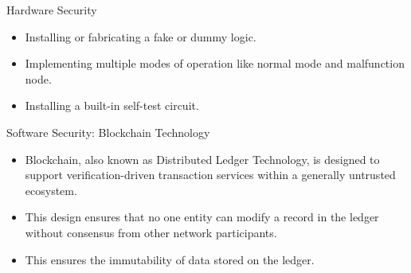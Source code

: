 \documentclass{beamer}
\begin{document}
\begin{frame}{Hardware Security}
    \begin{itemize}
        \item {Installing or fabricating a fake or dummy logic.}
        \item {Implementing multiple modes of operation like normal mode and malfunction node.}
        \item {Installing a built-in self-test circuit.}
    \end{itemize}
\end{frame}

\begin{frame}{Software Security: Blockchain Technology}
    \begin{itemize}
        \item {Blockchain, also known as Distributed Ledger Technology, is designed to support verification-driven transaction services within a generally untrusted ecosystem. \cite{art_ch_2019}}
        \item {This design ensures that no one entity can modify a record in the ledger without consensus from other network participants. \cite{art_ch_2019}}
        \item {This ensures the immutability of data stored on the ledger. \cite{art_ch_2019}}
    \end{itemize}
\end{frame}
\end{document}
